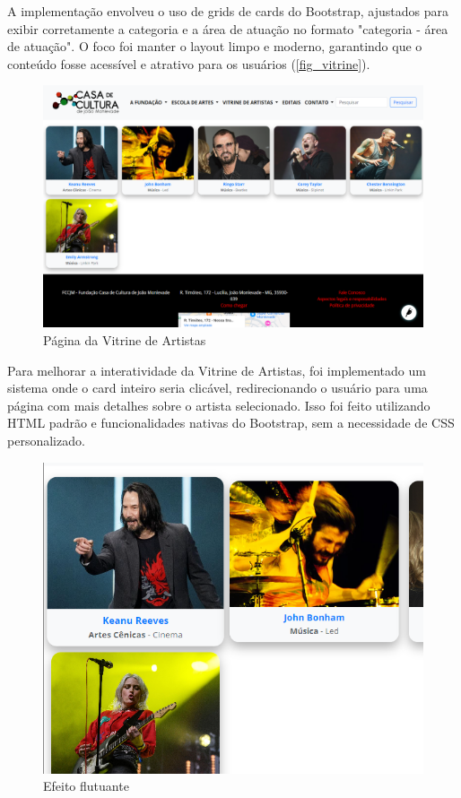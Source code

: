 A implementação envolveu o uso de grids de cards do Bootstrap, ajustados para exibir corretamente a categoria e a área de atuação no formato "categoria - área de atuação". O foco foi manter o layout limpo e moderno, garantindo que o conteúdo fosse acessível e atrativo para os usuários (\autoref{fig_vitrine}).

\begin{figure}[htb]
	\caption{\label{fig_vitrine}Página da Vitrine de Artistas}
	\begin{center}
	    \includegraphics[scale=0.35]{./img/vitrine_de_artistas.png}
	\end{center}
\end{figure}

Para melhorar a interatividade da Vitrine de Artistas, foi implementado um sistema onde o card inteiro seria clicável, redirecionando o usuário para uma página com mais detalhes sobre o artista selecionado. Isso foi feito utilizando \ac{HTML} padrão e funcionalidades nativas do Bootstrap, sem a necessidade de \ac{CSS} personalizado.


\begin{figure}[htb]
	\caption{\label{fig_grafico}Efeito flutuante}
	\begin{center}
	    \includegraphics[scale=0.5]{./img/vitrine_de_artistas_hover.png}
	\end{center}
\end{figure}

